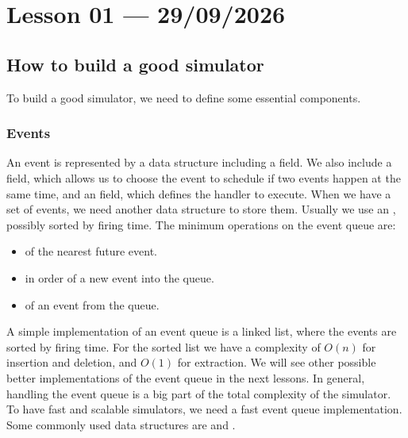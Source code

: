 \section{Lesson 01 --- 29/09/2026}

\subsection{How to build a good simulator}

To build a good simulator, we need to define some essential components.

\subsubsection{Events}

An event is represented by a data structure including a  field. We also include a  field, which allows us to choose the event to schedule if two events happen at the same time, and an  field, which defines the handler to execute.
When we have a set of events, we need another data structure to store them.
Usually we use an , possibly sorted by firing time. The minimum operations on the event queue are:
\begin{itemize}
\item {} of the nearest future event.
\item {} in order of a new event into the queue.
\item {} of an event from the queue.
\end{itemize}

A simple implementation of an event queue is a linked list, where the events are sorted by firing time. For the sorted list we have a complexity of $O(n)$ for insertion and deletion, and $O(1)$ for extraction.
We will see other possible better implementations of the event queue in the next lessons. In general, handling the event queue is a big part of the total complexity of the simulator. To have fast and scalable simulators, we need a fast event queue implementation. Some commonly used data structures are  and .

